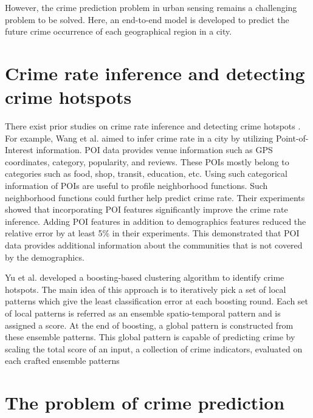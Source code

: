 \noindent However, the crime prediction problem in urban sensing remains a challenging 
problem to be solved. Here, an end-to-end model is developed to predict the future crime 
occurrence of each geographical region in a city.

\section{Crime rate inference and detecting crime hotspots}
There exist prior studies on crime rate inference and detecting crime 
hotspots \cite{p7,p2}. 
For example, Wang et al. \cite{p7} aimed to
infer crime rate in a city by utilizing Point-of-Interest 
information. 
POI data provides venue information such as GPS coordinates, category, 
popularity, and reviews. 
These POIs mostly belong to categories such as food, shop, transit, education, etc. 
Using such categorical information of POIs are useful to profile neighborhood 
functions. Such 
neighborhood functions could further help predict crime rate. Their experiments 
showed that 
incorporating POI features significantly improve the crime rate inference. Adding
POI features in addition to demographics features reduced the relative error 
by at least 5\% in 
their experiments. This demonstrated that POI data provides additional 
information about the communities that is not covered by the demographics.

\noindent Yu et al. \cite{p2} developed a boosting-based clustering algorithm
to identify crime hotspots. The main idea of this approach is
to iteratively pick a set of local patterns which give the least classification error
at each boosting round. Each set of local patterns is referred as an ensemble
spatio-temporal pattern and is assigned a score. At the end of boosting, a global 
pattern is constructed from these ensemble patterns. This global pattern is capable 
of predicting crime by scaling the total score of an input, a collection of crime 
indicators, evaluated on each crafted ensemble patterns 

\section{The problem of crime prediction}

